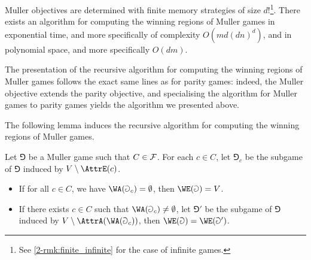 \begin{theorem}
\label{2-thm:muller}
Muller objectives are determined with finite memory strategies of size $d!$\footnote{See \cref{2-rmk:finite_infinite} for the case of infinite games.}.
There exists an algorithm for computing the winning regions of Muller games in exponential time,
and more specifically of complexity $O(m d (dn)^d)$, and in polynomial space, and more specifically $O(dm)$.
\end{theorem}
The presentation of the recursive algorithm for computing the winning regions of Muller games follows the exact same lines as for parity games:
indeed, the Muller objective extends the parity objective, and specialising the algorithm for Muller games to parity games
yields the algorithm we presented above.

The following lemma induces the recursive algorithm for computing the winning regions of Muller games.

\begin{lemma}
\label{2-lem:Muller_even}
Let $\Game$ be a Muller game such that $C \in \mathcal{F}$.
For each $c \in C$, let $\Game_c$ be the subgame of $\Game$ induced by $V \setminus \AttrE(c)$.
\begin{itemize}
	\item If for all $c \in C$, we have $\WA(\Game_c) = \emptyset$, then $\WE(\Game) = V$.
	\item If there exists $c \in C$ such that $\WA(\Game_c) \neq \emptyset$,
	let $\Game'$ be the subgame of $\Game$ induced by $V \setminus \AttrA( \WA(\Game_c) )$,
	then $\WE(\Game) = \WE(\Game')$.	
\end{itemize}
\end{lemma}

